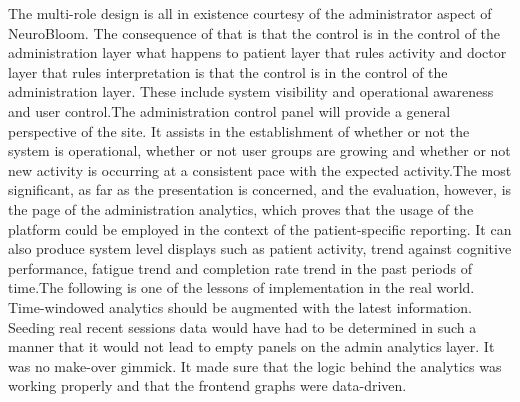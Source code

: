\documentclass[12pt,a4paper]{report}
\begin{document}
The multi-role design is all in existence courtesy of the administrator aspect of NeuroBloom. The consequence of that is that the control is in the control of the administration layer what happens to patient layer that rules activity and doctor layer that rules interpretation is that the control is in the control of the administration layer. These include system visibility and operational awareness and user control.The administration control panel will provide a general perspective of the site. It assists in the establishment of whether or not the system is operational, whether or not user groups are growing and whether or not new activity is occurring at a consistent pace with the expected activity.The most significant, as far as the presentation is concerned, and the evaluation, however, is the page of the administration analytics, which proves that the usage of the platform could be employed in the context of the patient-specific reporting. It can also produce system level displays such as patient activity, trend against cognitive performance, fatigue trend and completion rate trend in the past periods of time.The following is one of the lessons of implementation in the real world. Time-windowed analytics should be augmented with the latest information. Seeding real recent sessions data would have had to be determined in such a manner that it would not lead to empty panels on the admin analytics layer. It was no make-over gimmick. It made sure that the logic behind the analytics was working properly and that the frontend graphs were data-driven.

\FloatBarrier
\end{document}
